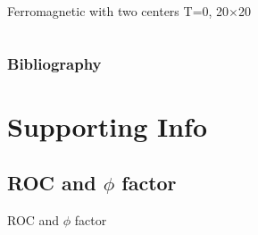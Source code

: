 \documentclass{beamer}
\begin{document}
\begin{frame}{Ferromagnetic with two centers T=0,  20$\times$20}
\begin{columns}
\begin{column}{0.5\textwidth}
\begin{center}
     \end{center}
\end{column}
\end{columns}
\end{frame}







\begin{frame}[t,allowframebreaks]
\frametitle{Bibliography}
\printbibliography
\end{frame}


\section{Supporting Info}

\subsection{ROC and $\phi$ factor}
\begin{frame}{}
\begin{center}
{\Huge ROC and $\phi$ factor}
\end{center}
\end{frame}
\end{document}
